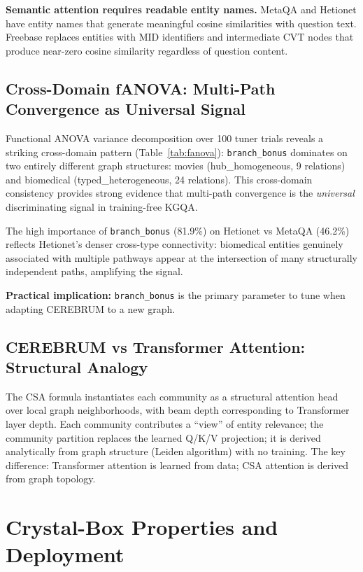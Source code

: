\documentclass[11pt,a4paper]{article}
\begin{document}
\textbf{Semantic attention requires readable entity names.} MetaQA and Hetionet
have entity names that generate meaningful cosine similarities with question text.
Freebase replaces entities with MID identifiers and intermediate CVT nodes that
produce near-zero cosine similarity regardless of question content.

\subsection{Cross-Domain fANOVA: Multi-Path Convergence as Universal Signal}
\label{sec:fanova_discuss}

Functional ANOVA variance decomposition over 100 tuner trials reveals a striking
cross-domain pattern (Table~\ref{tab:fanova}): \texttt{branch\_bonus} dominates
on two entirely different graph structures: movies (hub\_homogeneous, 9
relations) and biomedical (typed\_heterogeneous, 24 relations). This
cross-domain consistency provides strong evidence that multi-path convergence
is the \emph{universal} discriminating signal in training-free KGQA.

The high importance of \texttt{branch\_bonus} (81.9\%) on Hetionet vs MetaQA
(46.2\%) reflects Hetionet's denser cross-type connectivity: biomedical entities
genuinely associated with multiple pathways appear at the intersection of many
structurally independent paths, amplifying the signal.

\textbf{Practical implication:} \texttt{branch\_bonus} is the primary parameter
to tune when adapting CEREBRUM to a new graph.

\subsection{CEREBRUM vs Transformer Attention: Structural Analogy}

The CSA formula instantiates each community as a structural attention head over
local graph neighborhoods, with beam depth corresponding to Transformer layer
depth. Each community contributes a ``view'' of entity relevance; the community
partition replaces the learned Q/K/V projection; it is derived analytically from
graph structure (Leiden algorithm) with no training. The key difference:
Transformer attention is learned from data; CSA attention is derived from graph
topology.

\section{Crystal-Box Properties and Deployment}
\end{document}
